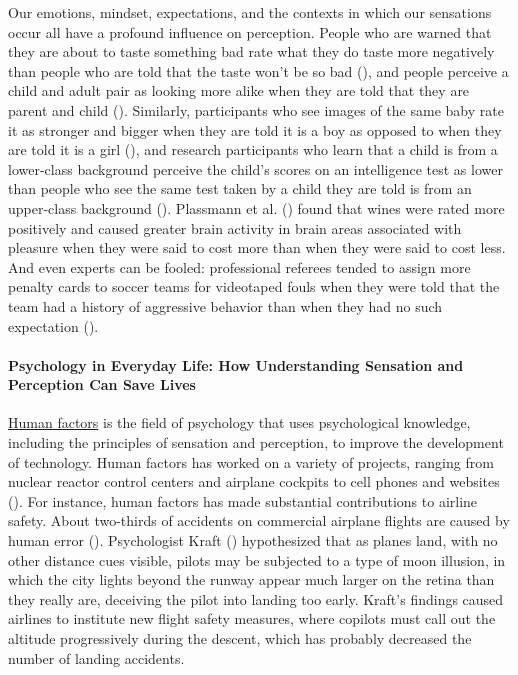 \documentclass[
]{krantz}
\begin{document}
Our emotions, mindset, expectations, and the contexts in which our sensations occur all have a profound influence on perception. People who are warned that they are about to taste something bad rate what they do taste more negatively than people who are told that the taste won't be so bad (), and people perceive a child and adult pair as looking more alike when they are told that they are parent and child (). Similarly, participants who see images of the same baby rate it as stronger and bigger when they are told it is a boy as opposed to when they are told it is a girl (), and research participants who learn that a child is from a lower-class background perceive the child's scores on an intelligence test as lower than people who see the same test taken by a child they are told is from an upper-class background (). Plassmann et al. () found that wines were rated more positively and caused greater brain activity in brain areas associated with pleasure when they were said to cost more than when they were said to cost less. And even experts can be fooled: professional referees tended to assign more penalty cards to soccer teams for videotaped fouls when they were told that the team had a history of aggressive behavior than when they had no such expectation ().

\paragraph*{Psychology in Everyday Life: How Understanding Sensation and Perception Can Save Lives}\label{psychology-in-everyday-life-how-understanding-sensation-and-perception-can-save-lives}

\hyperref[human-factors]{Human factors} is the field of psychology that uses psychological knowledge, including the principles of sensation and perception, to improve the development of technology. Human factors has worked on a variety of projects, ranging from nuclear reactor control centers and airplane cockpits to cell phones and websites (). For instance, human factors has made substantial contributions to airline safety. About two-thirds of accidents on commercial airplane flights are caused by human error (). Psychologist Kraft () hypothesized that as planes land, with no other distance cues visible, pilots may be subjected to a type of moon illusion, in which the city lights beyond the runway appear much larger on the retina than they really are, deceiving the pilot into landing too early. Kraft's findings caused airlines to institute new flight safety measures, where copilots must call out the altitude progressively during the descent, which has probably decreased the number of landing accidents.
\end{document}
